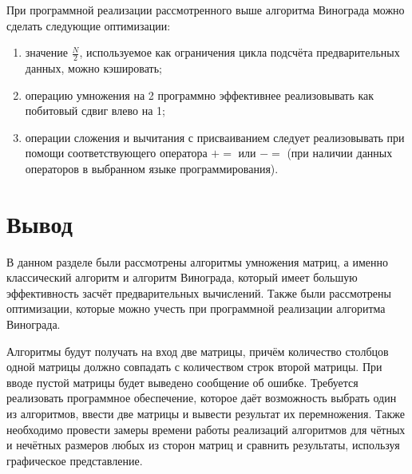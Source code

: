 При программной реализации рассмотренного выше алгоритма Винограда можно сделать следующие оптимизации:
\begin{enumerate}
	\item значение $\frac{N}{2}$, используемое как ограничения цикла подсчёта предварительных данных, можно кэшировать;
	\item операцию умножения на 2 программно эффективнее реализовывать как побитовый сдвиг влево на 1;
	\item операции сложения и вычитания с присваиванием следует реализовывать при помощи соответствующего оператора $+=$ или $-=$ (при наличии данных операторов в выбранном языке программирования).
\end{enumerate}

\section*{Вывод}
В данном разделе были рассмотрены алгоритмы умножения матриц, а именно классический алгоритм и алгоритм Винограда, который имеет большую эффективность засчёт предварительных вычислений.
Также были рассмотрены оптимизации, которые можно учесть при программной реализации алгоритма Винограда.

Алгоритмы будут получать на вход две матрицы, причём количество столбцов одной матрицы должно совпадать с количеством строк второй матрицы.
При вводе пустой матрицы будет выведено сообщение об ошибке.
Требуется реализовать программное обеспечение, которое даёт возможность выбрать один из алгоритмов, ввести две матрицы и вывести результат их перемножения.
Также необходимо провести замеры времени работы реализаций алгоритмов для чётных и нечётных размеров любых из сторон матриц и сравнить результаты, используя графическое представление.
